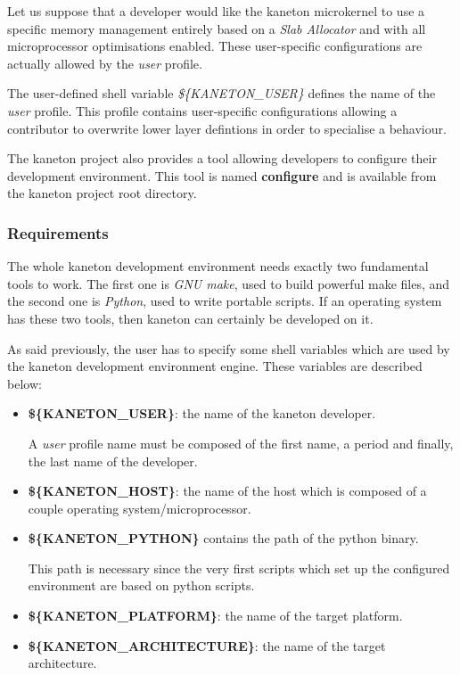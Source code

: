 

Let us suppose that a developer would like the kaneton microkernel to
use a specific memory management entirely based on a \textit{Slab Allocator}
and with all microprocessor optimisations enabled. These user-specific
configurations are actually allowed by the \textit{user} profile.

The user-defined shell variable \textit{\$\{KANETON\_USER\}} defines the name
of the \textit{user} profile. This profile contains user-specific
configurations allowing a contributor to overwrite lower layer defintions
in order to specialise a behaviour.

The kaneton project also provides a tool allowing developers to configure
their development environment. This tool is named \textbf{configure} and is
available from the kaneton project root directory.

%
%

\subsubsection{Requirements}

The whole kaneton development environment needs exactly two fundamental tools
to work. The first one is \textit{GNU make}, used to build powerful make files,
and the second one is \textit{Python}, used to write portable scripts. If an
operating system has these two tools, then kaneton can certainly be developed
on it.

As said previously, the user has to specify some shell variables which are
used by the kaneton development environment engine. These variables are
described below:

\begin{itemize}
  \item
    \textbf{\$\{KANETON\_USER\}}: the name of the kaneton developer.

    A \textit{user} profile name must be composed of the first name, a period
    and finally, the last name of the developer.
  \item
    \textbf{\$\{KANETON\_HOST\}}: the name of the host which is composed of
    a couple operating system/microprocessor.
  \item
    \textbf{\$\{KANETON\_PYTHON\}} contains the path of the python binary.

    This path is necessary since the very first scripts which set up the
    configured environment are based on python scripts.
  \item
    \textbf{\$\{KANETON\_PLATFORM\}}: the name of the target platform.
  \item
    \textbf{\$\{KANETON\_ARCHITECTURE\}}: the name of the target architecture.
\end{itemize}

